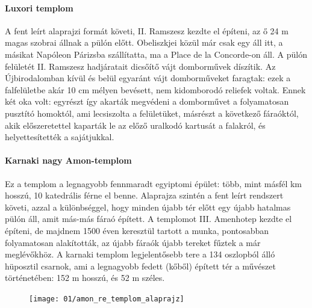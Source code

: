 \paragraph{Luxori templom}
A fent leírt alaprajzi formát követi, II. Ramszesz kezdte el építeni, az ő 24 m magas szobrai állnak a pülón előtt. Obeliszkjei közül már csak egy áll itt, a másikat Napóleon Párizsba szállítatta, ma a Place de la Concorde-on áll. A pülón felületét II. Ramszesz hadjáratait dicsőítő vájt domborművek díszítik. Az Újbirodalomban kívül és belül egyaránt vájt domborműveket faragtak: ezek a falfelületbe akár 10 cm mélyen bevésett, nem kidomborodó reliefek voltak. Ennek két oka volt: egyrészt így akarták megvédeni a domborművet a folyamatosan pusztító homoktól, ami lecsiszolta a felületüket, másrészt a következő fáraóktól, akik előszeretettel kaparták le az előző uralkodó kartusát a falakról, és helyettesítették a sajátjukkal.

\paragraph{Karnaki nagy Amon-templom}
Ez a templom a legnagyobb fennmaradt egyiptomi épület: több, mint másfél km hosszú, 10 katedrális férne el benne. Alaprajza szintén a fent leírt rendszert követi, azzal a különbséggel, hogy minden újabb tér előtt egy újabb hatalmas pülón áll, amit más-más fáraó épített. A templomot III. Amenhotep kezdte el építeni, de majdnem 1500 éven keresztül tartott a munka, pontosabban folyamatosan alakították, az újabb fáraók újabb tereket fűztek a már meglévőkhöz. A karnaki templom legjelentősebb tere a 134 oszlopból álló hüposztil csarnok, ami a legnagyobb fedett (kőből) épített tér a művészet történetében: 152 m hosszú, és 52 m széles.

\begin{figure}[H]
	\centering
	\begin{tcolorbox}[enhanced,colframe=gray!50!white,
		colbacktitle=gray!15!white,
		coltitle=gray!50!black,
		borderline={0.5mm}{0mm}{gray!15!white},
		borderline={0.5mm}{0mm}{gray!50!white,dashed},
		attach boxed title to top center={yshift=-2mm},
		boxed title style={boxrule=0.4pt},
		title=Az Amon-Ré templomkörzet]{
			\texttt{[image: 01/amon\_re\_templom\_alaprajz]}}
		
	\end{tcolorbox}
\end{figure}

